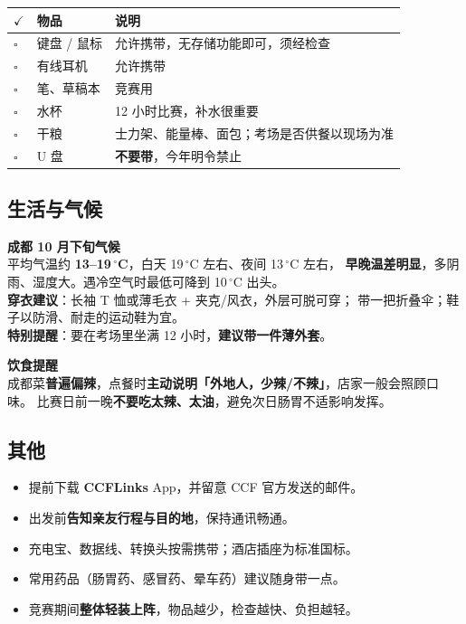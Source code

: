 \documentclass[11pt,a4paper,fontset=windows]{ctexart}
\newcommand{\thd}[1]{\textbf{\color{main}#1}}   %
\begin{document}
\begin{center}
\begin{tabularx}{\textwidth}{@{}L{0.9cm}L{4.2cm}X@{}}
\toprule
\thd{$\checkmark$} & \thd{物品} & \thd{说明}\\
\midrule
$\square$ & 键盘 / 鼠标 & 允许携带，无存储功能即可，须经检查\\
$\square$ & 有线耳机 & 允许携带\\
$\square$ & 笔、草稿本 & 竞赛用\\
$\square$ & 水杯 & 12 小时比赛，补水很重要\\
$\square$ & 干粮 & 士力架、能量棒、面包；考场是否供餐以现场为准\\
$\square$ & \textcolor{accent}{U 盘} & \textcolor{accent}{\textbf{不要带}}，今年明令禁止\\
\bottomrule
\end{tabularx}
\end{center}

\subsection{生活与气候}

\begin{keybox}
\textbf{成都 10 月下旬气候}\\
平均气温约 \textbf{13--19\,$^\circ$C{}}，白天 19\,$^\circ$C{} 左右、夜间 13\,$^\circ$C{} 左右，
\textbf{早晚温差明显}，多阴雨、湿度大。遇冷空气时最低可降到 10\,$^\circ$C{} 出头。\\[0.4em]
\textbf{穿衣建议}：长袖 T 恤或薄毛衣 + 夹克/风衣，外层可脱可穿；
带一把折叠伞；鞋子以防滑、耐走的运动鞋为宜。\\
\textbf{特别提醒}：要在考场里坐满 12 小时，\textbf{建议带一件薄外套}。
\end{keybox}

\begin{warnbox}
\textbf{饮食提醒}\\
成都菜\textbf{普遍偏辣}，点餐时\textbf{主动说明「外地人，少辣/不辣」}，店家一般会照顾口味。
比赛日前一晚\textbf{不要吃太辣、太油}，避免次日肠胃不适影响发挥。
\end{warnbox}

\subsection{其他}

\begin{itemize}[leftmargin=1.6em,itemsep=0.3em]
  \item 提前下载 \textbf{CCFLinks} App，并留意 CCF 官方发送的邮件。
  \item 出发前\textbf{告知亲友行程与目的地}，保持通讯畅通。
  \item 充电宝、数据线、转换头按需携带；酒店插座为标准国标。
  \item 常用药品（肠胃药、感冒药、晕车药）建议随身带一点。
  \item 竞赛期间\textbf{整体轻装上阵}，物品越少，检查越快、负担越轻。
\end{itemize}
\end{document}
